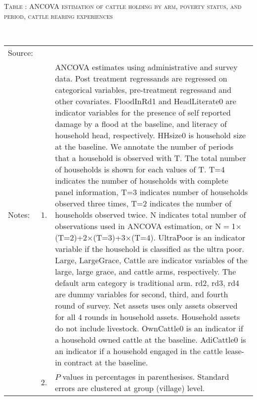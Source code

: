 \vspace{-1cm}\hspace{-1cm}\begin{minipage}[t]{14cm}
\hfil\textsc{\normalsize Table \thetable: ANCOVA estimation of cattle holding by arm, poverty status, and period, cattle rearing experiences\label{tab ANCOVA NumCows Experience timevarying poverty status}}\\
\setlength{\tabcolsep}{1pt}
\setlength{\baselineskip}{8pt}
\renewcommand{\arraystretch}{.52}
\hfil{}\\
\renewcommand{\arraystretch}{.8}
\setlength{\tabcolsep}{1pt}
\begin{tabular}{>{\hfill\scriptsize}p{1cm}<{}>{\hfill\scriptsize}p{.25cm}<{}>{\scriptsize}p{12cm}<{\hfill}}
Source:& \multicolumn{2}{l}{\scriptsize Estimated with GUK administrative and survey data.}\\
Notes: & 1. & ANCOVA estimates using administrative and survey data. Post treatment regressands are regressed on categorical variables, pre-treatment regressand and other covariates. \textsf{FloodInRd1} and \textsf{HeadLiterate0} are indicator variables for the presence of self reported damage by a flood at the baseline, and literacy of household head, respectively. \textsf{HHsize0} is household size at the baseline. We annotate the number of periods that a household is observed with \textsf{T}. The total number of households is shown for each values of \textsf{T}. \textsf{T=4} indicates the number of households with complete panel information, \textsf{T=3} indicates number of households observed three times, \textsf{T=2} indicates the number of households observed twice. \textsf{N} indicates total number of observations used in ANCOVA estimation, or \textsf{N$=$1$\times$(T=2)+2$\times$(T=3)+3$\times$(T=4)}.  \textsf{UltraPoor} is an indicator variable if the household is classified as the ultra poor. \textsf{Large}, \textsf{LargeGrace}, \textsf{Cattle} are indicator variables of the \textsf{large}, \textsf{large grace}, and \textsf{cattle} arms, respectively. The default arm category is \textsf{traditional} arm. \textsf{rd2, rd3, rd4} are dummy variables for second, third, and fourth round of survey. Net assets uses only assets observed for all 4 rounds in household assets. Household assets do not include livestock. \textsf{OwnCattle0} is an indicator if a household owned cattle at the baseline. \textsf{AdiCattle0} is an indicator if a household engaged in the cattle lease-in contract at the baseline.  \\
& 2. & $P$ values in percentages in parenthesises. Standard errors are clustered at group (village) level.
\end{tabular}
\end{minipage}


